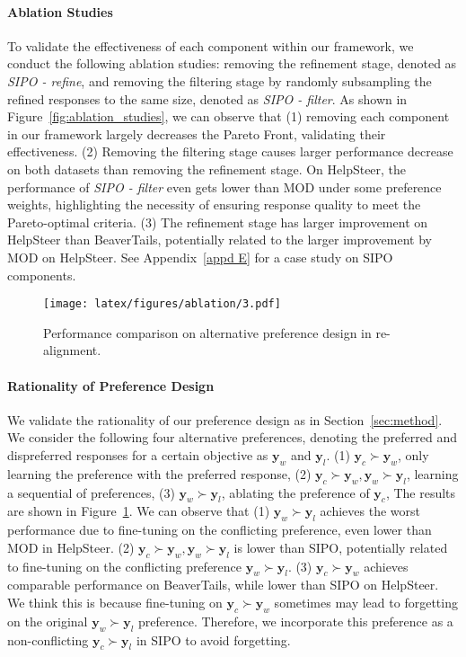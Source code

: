 \paragraph{Ablation Studies}
To validate the effectiveness of each component within our framework, we conduct the following ablation studies: removing the refinement stage, denoted as \textit{SIPO - refine}, and removing the filtering stage by randomly subsampling the refined responses to the same size, denoted as \textit{SIPO - filter}. 
As shown in Figure~\ref{fig:ablation_studies}, we can observe that 
(1) removing each component in our framework largely decreases the Pareto Front, validating their effectiveness. 
(2) Removing the filtering stage causes larger performance decrease on both datasets than removing the refinement stage. On HelpSteer, the performance of \textit{SIPO - filter} even gets lower than MOD under some preference weights, highlighting the necessity of ensuring response quality to meet the Pareto-optimal criteria. 
(3) The refinement stage has larger improvement on HelpSteer than BeaverTails,  potentially related to the larger improvement by MOD on HelpSteer. 
See Appendix~\ref{appd E} for a case study on SIPO components. 


\begin{figure}[t]
 \setlength{\abovecaptionskip}{0.05cm}
 \setlength{\belowcaptionskip}{0cm}
    \centering
    \texttt{[image: latex/figures/ablation/3.pdf]}
    \caption{Performance comparison on alternative preference design in re-alignment.}
    \label{fig:preference}
\end{figure}

\paragraph{Rationality of Preference Design} \label{sec:preference_rationality}
We validate the rationality of our preference design as in Section~\ref{sec:method}.  
We consider the following four alternative preferences, denoting the preferred and dispreferred responses for a certain objective as $\textbf{y}_w$ and $\textbf{y}_l$. 
(1) $\textbf{y}_c \succ \textbf{y}_w$, only learning the preference with the preferred response,  
(2) $\textbf{y}_c \succ \textbf{y}_w, \textbf{y}_w \succ \textbf{y}_l$, learning a sequential of preferences,  
(3) $\textbf{y}_w \succ \textbf{y}_l$, ablating the preference of $\textbf{y}_c$, 
The results are shown in Figure~\ref{fig:preference}. We can observe that
(1) $\textbf{y}_w \succ \textbf{y}_l$ achieves the worst performance due to fine-tuning on the conflicting preference, even lower than MOD in HelpSteer. 
(2) $\textbf{y}_c \succ \textbf{y}_w, \textbf{y}_w \succ \textbf{y}_l$ is lower than SIPO, potentially related to fine-tuning on the conflicting preference $\textbf{y}_w \succ \textbf{y}_l$. 
(3) $\textbf{y}_c \succ \textbf{y}_w$ achieves comparable performance on BeaverTails, while lower than SIPO on HelpSteer. We think this is because fine-tuning on $\textbf{y}_c \succ \textbf{y}_w$ sometimes may lead to forgetting on the original $\textbf{y}_w \succ \textbf{y}_l$ preference. Therefore, we incorporate this preference as a non-conflicting $\textbf{y}_c \succ \textbf{y}_l$ in SIPO to avoid forgetting. 


